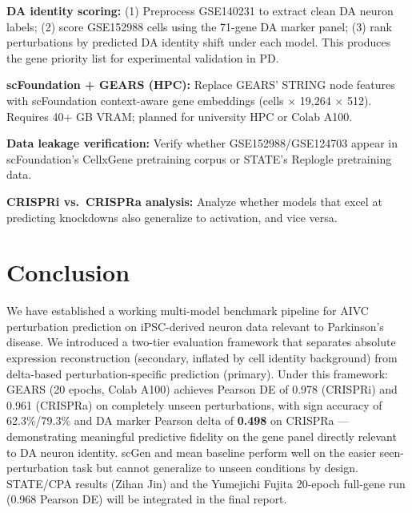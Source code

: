 \documentclass[11pt,letterpaper]{article}
\begin{document}
\textbf{DA identity scoring:} (1) Preprocess GSE140231 to extract clean DA neuron labels;
(2) score GSE152988 cells using the 71-gene DA marker panel; (3) rank perturbations by predicted
DA identity shift under each model. This produces the gene priority list for experimental
validation in PD.

\textbf{scFoundation + GEARS (HPC):} Replace GEARS' STRING node features with scFoundation
context-aware gene embeddings (cells $\times$ 19,264 $\times$ 512). Requires 40+ GB VRAM;
planned for university HPC or Colab A100.

\textbf{Data leakage verification:} Verify whether GSE152988/GSE124703 appear in scFoundation's
CellxGene pretraining corpus or STATE's Replogle pretraining data.

\textbf{CRISPRi vs.\ CRISPRa analysis:} Analyze whether models that excel at predicting
knockdowns also generalize to activation, and vice versa.

\section{Conclusion}

We have established a working multi-model benchmark pipeline for AIVC perturbation prediction on
iPSC-derived neuron data relevant to Parkinson's disease. We introduced a two-tier evaluation
framework that separates absolute expression reconstruction (secondary, inflated by cell identity
background) from delta-based perturbation-specific prediction (primary). Under this framework:
GEARS (20 epochs, Colab A100) achieves Pearson DE of 0.978 (CRISPRi) and 0.961 (CRISPRa) on
completely unseen perturbations, with sign accuracy of 62.3\%/79.3\% and DA marker Pearson
delta of \textbf{0.498} on CRISPRa --- demonstrating meaningful predictive fidelity on the gene
panel directly relevant to DA neuron identity. scGen and mean baseline perform well on the easier
seen-perturbation task but cannot generalize to unseen conditions by design. STATE/CPA results
(Zihan Jin) and the Yumejichi Fujita 20-epoch full-gene run (0.968 Pearson DE) will be integrated
in the final report.
\end{document}
